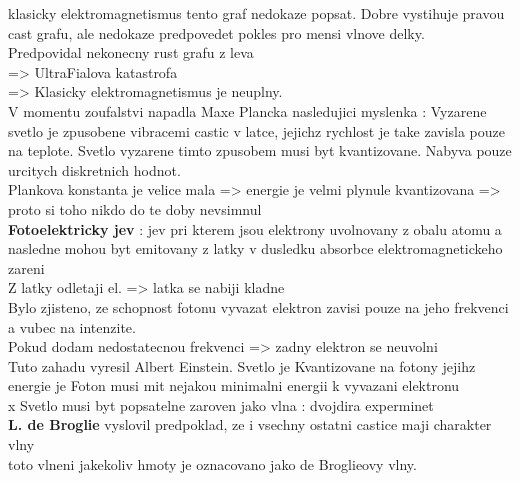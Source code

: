 \documentclass{report}
\begin{document}
klasicky elektromagnetismus tento graf nedokaze popsat. Dobre vystihuje pravou cast grafu, ale nedokaze predpovedet pokles pro mensi vlnove delky. \\
Predpovidal nekonecny rust grafu z leva \\
=> UltraFialova katastrofa \\
=> Klasicky elektromagnetismus je neuplny. \\
V momentu zoufalstvi napadla Maxe Plancka nasledujici myslenka : Vyzarene svetlo je zpusobene vibracemi castic v latce, jejichz rychlost je take zavisla pouze na teplote. Svetlo vyzarene timto zpusobem musi byt kvantizovane. Nabyva pouze urcitych diskretnich hodnot. \\
Plankova konstanta je velice mala => energie je velmi plynule kvantizovana => proto si toho nikdo do te doby nevsimnul \\

\textbf{Fotoelektricky jev} : jev pri kterem jsou elektrony uvolnovany z obalu atomu a nasledne mohou byt emitovany z latky v dusledku absorbce elektromagnetickeho zareni \\
Z latky odletaji el. => latka se nabiji kladne \\
Bylo zjisteno, ze schopnost fotonu vyvazat elektron zavisi pouze na jeho frekvenci a vubec na intenzite. \\
Pokud dodam nedostatecnou frekvenci => zadny elektron se neuvolni \\
Tuto zahadu vyresil Albert Einstein. Svetlo je Kvantizovane na fotony jejihz energie je 
Foton musi mit nejakou minimalni energii k vyvazani elektronu \\
x Svetlo musi byt popsatelne zaroven jako vlna : dvojdira experminet  \\


\textbf{L. de Broglie} vyslovil predpoklad, ze i vsechny ostatni castice maji charakter vlny \\

toto vlneni jakekoliv hmoty je oznacovano jako de Broglieovy vlny.
\end{document}
